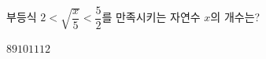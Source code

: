 부등식 $2<\sqrt{\dfrac{x}{5}}<\dfrac{5}{2}$를 만족시키는 자연수 $x$의 개수는?
\begin{choices32}{$8$}{$9$}{$10$}{$11$}{$12$}\end{choices32}
